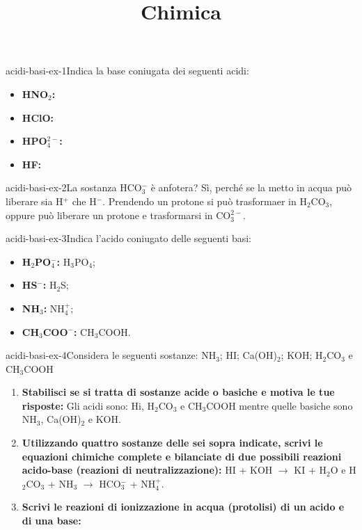 \documentclass[preview]{standalone}
\begin{document}
\title{Chimica}
\genpage

\begin{snippetexercise}{acidi-basi-ex-1}{Indica la base coniugata dei seguenti acidi:}
    \begin{itemize}
        \item \textbf{HNO\(_2\):}
        \item \textbf{HClO:}
        \item \textbf{HPO\(_4^{2-}\):}
        \item \textbf{HF:}
    \end{itemize}
\end{snippetexercise}

\begin{snippetexercise}{acidi-basi-ex-2}{La sostanza HCO\(_3^-\) è anfotera?}
    Sì, perché se la metto in acqua può liberare sia H\({}^+\) che H\({}^-\).
    Prendendo un protone si può trasformaer in H\({}_2\)CO\({}_3\),
    oppure può liberare un protone e trasformarsi in CO\({}_3^{2-}\).
\end{snippetexercise}


\begin{snippetexercise}{acidi-basi-ex-3}{Indica l'acido coniugato delle seguenti basi:}
    \begin{itemize}
        \item \textbf{H\({}_2\)PO\({}_4^-\):} H\(_3\)PO\(_4\);
        \item \textbf{HS\({}^-\):} H\(_2\)S;
        \item \textbf{NH\({}_3\):} NH\(_4^+\);
        \item \textbf{CH\({}_3\)COO\({}^-\):} CH\(_3\)COOH.
    \end{itemize}
\end{snippetexercise}

\begin{snippetexercise}{acidi-basi-ex-4}{Considera le seguenti sostanze:
    NH\(_3\); HI; Ca(OH)\({}_2\); KOH; H\({}_2\)CO\({}_3\) e CH\({}_3\)COOH}
    \begin{enumerate}
        \item \textbf{Stabilisci se si tratta di sostanze acide o basiche e motiva le tue risposte:}
            Gli acidi sono: Hi, H\({}_2\)CO\({}_3\) e CH\({}_3\)COOH
            mentre quelle basiche sono NH\(_3\), Ca(OH)\({}_2\) e KOH.
        \item \textbf{Utilizzando quattro sostanze delle sei sopra indicate, scrivi le equazioni chimiche
        complete e bilanciate di due possibili reazioni acido-base (reazioni di
        neutralizzazione):}
        HI + KOH \(\rightarrow\) KI + H\({}_2\)O
        e
        H\({}_2\)CO\({}_3\) + NH\({}_3\) \(\rightarrow\) HCO\({}_3^-\) + NH\({}_4^+\).
        \item \textbf{Scrivi le reazioni di ionizzazione in acqua (protolisi) di un acido e di una base:}

    \end{enumerate}
\end{snippetexercise}
\end{document}
